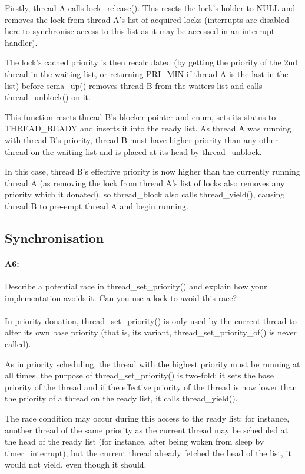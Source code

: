 Firstly, thread A calls lock\_release(). This resets the lock's holder to NULL and removes the lock from thread A's list of acquired locks (interrupts are disabled here to synchronise access to this list as it may be accessed in an interrupt handler).

The lock's cached priority is then recalculated (by getting the priority of the 2nd thread in the waiting list, or returning PRI\_MIN if thread A is the last in the list) before sema\_up() removes thread B from the waiters list and calls thread\_unblock() on it.

This function resets thread B's blocker pointer and enum, sets its status to THREAD\_READY and inserts it into the ready list.
As thread A was running with thread B's priority, thread B must have higher priority than any other thread on the waiting list and is placed at its head by thread\_unblock.

In this case, thread B's effective priority is now higher than the currently running thread A (as removing the lock from thread A's list of locks also removes any priority which it donated), so thread\_block also calls thread\_yield(), causing thread B to pre-empt thread A and begin running.

\subsection{Synchronisation}
\paragraph{A6:} %
Describe a potential race in thread\_set\_priority() and explain how your implementation avoids it.  Can you use a lock to avoid this race?
\\
\\
In priority donation, thread\_set\_priority() is only used by the current thread to alter its own base priority (that is, its variant, thread\_set\_priority\_of() is never called).

As in priority scheduling, the thread with the highest priority must be running at all times, the purpose of thread\_set\_priority() is two-fold: it sets the base priority of the thread and if the effective priority of the thread is now lower than the priority of a thread on the ready list, it calls thread\_yield().

The race condition may occur during this access to the ready list: for instance, another thread of the same priority as the current thread may be scheduled at the head of the ready list (for instance, after being woken from sleep by timer\_interrupt), but the current thread already fetched the head of the list, it would not yield, even though it should.

